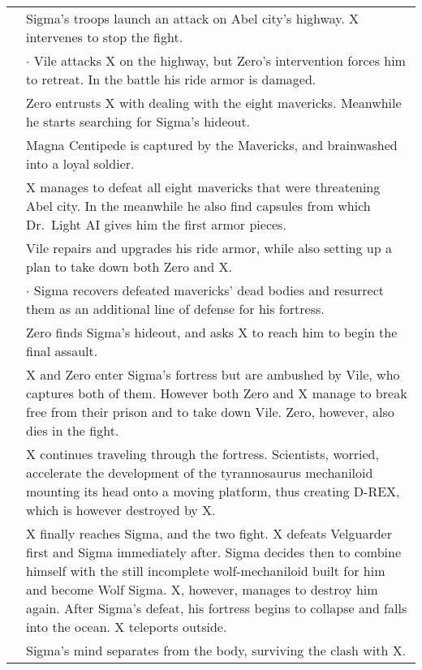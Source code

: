 \begin{tabularx}{\linewidth}{l X}
	\addlinespace[1.5ex]
	\tabdot& Sigma's troops launch an attack on Abel city's highway. X intervenes to stop the fight.\\
	\tabline& $\cdot$ Vile attacks X on the highway, but Zero's intervention forces him to retreat. In the battle his ride armor is damaged.\\
	\tabdot& Zero entrusts X with dealing with the eight mavericks. Meanwhile he starts searching for Sigma's hideout.\\
	\tabdot& Magna Centipede is captured by the Mavericks, and brainwashed into a loyal soldier.\\
	\tabdot& X manages to defeat all eight mavericks that were threatening Abel city. In the meanwhile he also find capsules from which Dr.~Light AI gives him the first armor pieces.\\
	\timemoment{Gravity Beetle swears revenge against X for his brother's (Boomer Kuwanger) death.}
	\tabdot& Vile repairs and upgrades his ride armor, while also setting up a plan to take down both Zero and X.\\
	\tabline& $\cdot$ Sigma recovers defeated mavericks' dead bodies and resurrect them as an additional line of defense for his fortress.\\
	\tabdot& Zero finds Sigma's hideout, and asks X to reach him to begin the final assault.\\
	\tabdot& X and Zero enter Sigma's fortress but are ambushed by Vile, who captures both of them. However both Zero and X manage to break free from their prison and to take down Vile. Zero, however, also dies in the fight.\\
	\tabdot& X continues traveling through the fortress. Scientists, worried, accelerate the development of the tyrannosaurus mechaniloid mounting its head onto a moving platform, thus creating D-REX, which is however destroyed by X.\\
	\tabdot& X finally reaches Sigma, and the two fight. X defeats Velguarder first and Sigma immediately after. Sigma decides then to combine himself with the still incomplete wolf-mechaniloid built for him and become Wolf Sigma. X, however, manages to destroy him again. After Sigma's defeat, his fortress begins to collapse and falls into the ocean. X teleports outside.\\
	\tabdot& Sigma's mind separates from the body, surviving the clash with X.\\
	\midrule
	

\end{tabularx}
